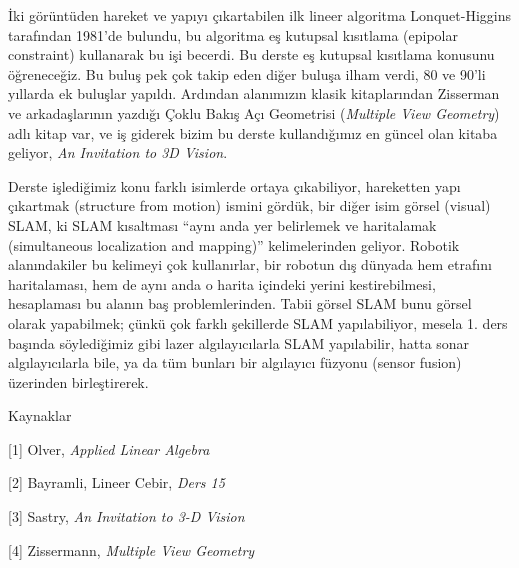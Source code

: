 \documentclass[12pt,fleqn]{article}\usepackage{../../common}
\begin{document}
İki görüntüden hareket ve yapıyı çıkartabilen ilk lineer algoritma
Lonquet-Higgins tarafından 1981'de bulundu, bu algoritma eş kutupsal
kısıtlama (epipolar constraint) kullanarak bu işi becerdi. Bu derste eş
kutupsal kısıtlama konusunu öğreneceğiz. Bu buluş pek çok takip eden diğer
buluşa ilham verdi, 80 ve 90'li yıllarda ek buluşlar yapıldı. Ardından
alanımızın klasik kitaplarından Zisserman ve arkadaşlarının yazdığı Çoklu
Bakış Açı Geometrisi ({\em Multiple View Geometry}) adlı kitap var, ve iş
giderek bizim bu derste kullandığımız en güncel olan kitaba geliyor, 
{\em An Invitation to 3D Vision}. 

Derste işlediğimiz konu farklı isimlerde ortaya çıkabiliyor, hareketten
yapı çıkartmak (structure from motion) ismini gördük, bir diğer isim görsel
(visual) SLAM, ki SLAM kısaltması ``aynı anda yer belirlemek ve haritalamak
(simultaneous localization and mapping)'' kelimelerinden geliyor. Robotik
alanındakiler bu kelimeyi çok kullanırlar, bir robotun dış dünyada hem
etrafını haritalaması, hem de aynı anda o harita içindeki yerini
kestirebilmesi, hesaplaması bu alanın baş problemlerinden. Tabii görsel
SLAM bunu görsel olarak yapabilmek; çünkü çok farklı şekillerde SLAM
yapılabiliyor, mesela 1. ders başında söylediğimiz gibi lazer
algılayıcılarla SLAM yapılabilir, hatta sonar algılayıcılarla bile, ya da
tüm bunları bir algılayıcı füzyonu (sensor fusion) üzerinden birleştirerek.


Kaynaklar 

[1] Olver, {\em Applied Linear Algebra}

[2] Bayramli, Lineer Cebir, {\em Ders 15}

[3] Sastry, {\em An Invitation to 3-D Vision}

[4] Zissermann, {\em Multiple View Geometry}
\end{document}
